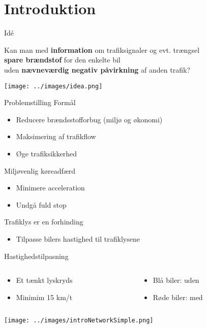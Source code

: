 \section{Introduktion}

\begin{frame}{Idé}
\begin{center}
Kan man med \textbf{information} om trafiksignaler og evt. trængsel\\\textbf{spare brændstof} for den enkelte bil\\uden \textbf{nævneværdig negativ påvirkning} af anden trafik?
\end{center}
\texttt{[image: ../images/idea.png]}
\end{frame}

\begin{frame}{Problemstilling}
Formål
\begin{itemize}
\item Reducere brændsstofforbug (miljø og økonomi)
\item Maksimering af trafikflow
\item Øge trafiksikkerhed
\end{itemize}

\vspace{5mm}
Miljøvenlig køreadfærd
\begin{itemize}
\item Minimere acceleration
\item Undgå fuld stop
\end{itemize}

\vspace{5mm}
Trafiklys er en forhinding
\begin{itemize}
\item Tilpasse bilers hastighed til trafiklysene
\end{itemize}
\end{frame}

\begin{frame}{Hastighedstilpasning}
\begin{columns}
\begin{column}{0.4\textwidth}
\begin{itemize}
\item Et tænkt lyskryds
\item Minimim 15 km/t
\end{itemize}
\end{column}
\begin{column}{0.6\textwidth}
\begin{itemize}
\item Blå biler: uden \tech
\item Røde biler: med \tech
\end{itemize}
\end{column}
\end{columns}

\vspace{3mm}
\texttt{[image: ../images/introNetworkSimple.png]}
\end{frame}

